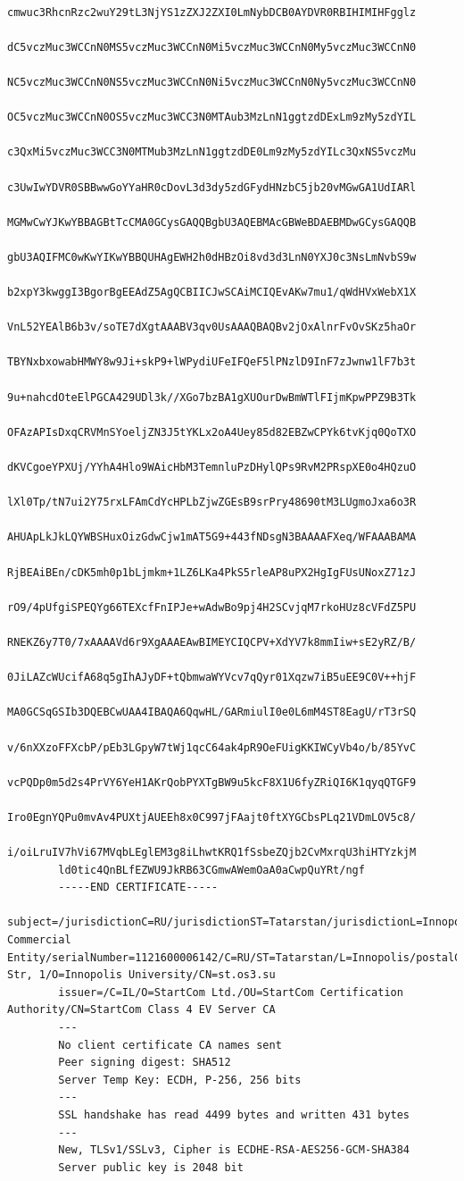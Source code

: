 \documentclass[10pt]{article}
\begin{document}
\begin{enumerate}
\begin{verbatim}
        cmwuc3RhcnRzc2wuY29tL3NjYS1zZXJ2ZXI0LmNybDCB0AYDVR0RBIHIMIHFgglz
        dC5vczMuc3WCCnN0MS5vczMuc3WCCnN0Mi5vczMuc3WCCnN0My5vczMuc3WCCnN0
        NC5vczMuc3WCCnN0NS5vczMuc3WCCnN0Ni5vczMuc3WCCnN0Ny5vczMuc3WCCnN0
        OC5vczMuc3WCCnN0OS5vczMuc3WCC3N0MTAub3MzLnN1ggtzdDExLm9zMy5zdYIL
        c3QxMi5vczMuc3WCC3N0MTMub3MzLnN1ggtzdDE0Lm9zMy5zdYILc3QxNS5vczMu
        c3UwIwYDVR0SBBwwGoYYaHR0cDovL3d3dy5zdGFydHNzbC5jb20vMGwGA1UdIARl
        MGMwCwYJKwYBBAGBtTcCMA0GCysGAQQBgbU3AQEBMAcGBWeBDAEBMDwGCysGAQQB
        gbU3AQIFMC0wKwYIKwYBBQUHAgEWH2h0dHBzOi8vd3d3LnN0YXJ0c3NsLmNvbS9w
        b2xpY3kwggI3BgorBgEEAdZ5AgQCBIICJwSCAiMCIQEvAKw7mu1/qWdHVxWebX1X
        VnL52YEAlB6b3v/soTE7dXgtAAABV3qv0UsAAAQBAQBv2jOxAlnrFvOvSKz5haOr
        TBYNxbxowabHMWY8w9Ji+skP9+lWPydiUFeIFQeF5lPNzlD9InF7zJwnw1lF7b3t
        9u+nahcdOteElPGCA429UDl3k//XGo7bzBA1gXUOurDwBmWTlFIjmKpwPPZ9B3Tk
        OFAzAPIsDxqCRVMnSYoeljZN3J5tYKLx2oA4Uey85d82EBZwCPYk6tvKjq0QoTXO
        dKVCgoeYPXUj/YYhA4Hlo9WAicHbM3TemnluPzDHylQPs9RvM2PRspXE0o4HQzuO
        lXl0Tp/tN7ui2Y75rxLFAmCdYcHPLbZjwZGEsB9srPry48690tM3LUgmoJxa6o3R
        AHUApLkJkLQYWBSHuxOizGdwCjw1mAT5G9+443fNDsgN3BAAAAFXeq/WFAAABAMA
        RjBEAiBEn/cDK5mh0p1bLjmkm+1LZ6LKa4PkS5rleAP8uPX2HgIgFUsUNoxZ71zJ
        rO9/4pUfgiSPEQYg66TEXcfFnIPJe+wAdwBo9pj4H2SCvjqM7rkoHUz8cVFdZ5PU
        RNEKZ6y7T0/7xAAAAVd6r9XgAAAEAwBIMEYCIQCPV+XdYV7k8mmIiw+sE2yRZ/B/
        0JiLAZcWUcifA68q5gIhAJyDF+tQbmwaWYVcv7qQyr01Xqzw7iB5uEE9C0V++hjF
        MA0GCSqGSIb3DQEBCwUAA4IBAQA6QqwHL/GARmiulI0e0L6mM4ST8EagU/rT3rSQ
        v/6nXXzoFFXcbP/pEb3LGpyW7tWj1qcC64ak4pR9OeFUigKKIWCyVb4o/b/85YvC
        vcPQDp0m5d2s4PrVY6YeH1AKrQobPYXTgBW9u5kcF8X1U6fyZRiQI6K1qyqQTGF9
        Iro0EgnYQPu0mvAv4PUXtjAUEEh8x0C997jFAajt0ftXYGCbsPLq21VDmLOV5c8/
        i/oiLruIV7hVi67MVqbLEglEM3g8iLhwtKRQ1fSsbeZQjb2CvMxrqU3hiHTYzkjM
        ld0tic4QnBLfEZWU9JkRB63CGmwAWemOaA0aCwpQuYRt/ngf
        -----END CERTIFICATE-----
        subject=/jurisdictionC=RU/jurisdictionST=Tatarstan/jurisdictionL=Innopolis/businessCategory=Non-Commercial Entity/serialNumber=1121600006142/C=RU/ST=Tatarstan/L=Innopolis/postalCode=420500/street=Universitetskaya Str, 1/O=Innopolis University/CN=st.os3.su
        issuer=/C=IL/O=StartCom Ltd./OU=StartCom Certification Authority/CN=StartCom Class 4 EV Server CA
        ---
        No client certificate CA names sent
        Peer signing digest: SHA512
        Server Temp Key: ECDH, P-256, 256 bits
        ---
        SSL handshake has read 4499 bytes and written 431 bytes
        ---
        New, TLSv1/SSLv3, Cipher is ECDHE-RSA-AES256-GCM-SHA384
        Server public key is 2048 bit

\end{verbatim}
\end{enumerate}
\end{document}
